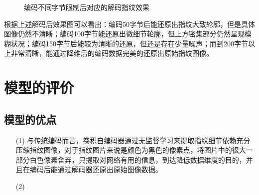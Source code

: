 \documentclass{whutmod}
\begin{document}
\begin{itemize}
\begin{figure}[H]
  		\caption{编码不同字节限制后对应的解码指纹效果}
  		\label{fisg}
  	\end{figure}
  	根据上述解码后效果图可以看出：编码50字节后能还原出指纹大致轮廓，但是具体图像仍然不清晰；编码100字节能还原出微细节轮廓，但上方密集部分仍然呈现模糊状况；编码150字节后能较为清晰的还原，但还是存在少量噪声；而到200字节以上非常清晰，能通过降维后的编码数据完美的还原出原始指纹图像。
 	
  	\section{模型的评价}
		\subsection{模型的优点}
			\begin{itemize}                                             
			\item [(1)] 与传统编码而言，卷积自编码器通过无监督学习来提取指纹细节依赖充分压缩指纹图像，对于指纹图片来说是颜色为黑色的像素点，将图片中的很大一部分白色像素舍弃，只提取对网络有用的信息，到达降低数据维度的目的，并且在编码后能通过解码器还原出原始图像数据。
			\item [(2)] 	
			\end{itemize}

\end{itemize}
\end{document}
